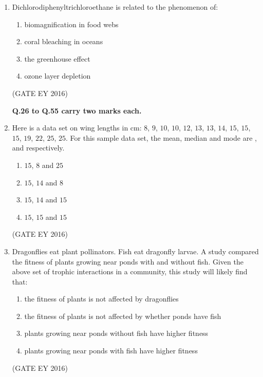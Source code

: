 \documentclass[journal]{IEEEtran}
\begin{document}
\begin{enumerate}
\item Dichlorodiphenyltrichloroethane is related to the phenomenon of:
\begin{enumerate}
    \item biomagnification in food webs
    \item coral bleaching in oceans
    \item the greenhouse effect
    \item ozone layer depletion
\end{enumerate}
\hfill{(GATE EY 2016)}

\textbf{Q.26 to Q.55 carry two marks each.}

\item Here is a data set on wing lengths in cm: $8$, $9$, $10$, $10$, $12$, $13$, $13$, $14$, $15$, $15$, $15$, $19$, $22$, $25$, $25$. For this sample data set, the mean, median and mode are \underline{\hspace{3cm}}, \underline{\hspace{3cm}} and \underline{\hspace{3cm}} respectively.
\begin{multicols}{4}
\begin{enumerate}
    \item $15$, $8$ and $25$
    \item $15$, $14$ and $8$
    \item $15$, $14$ and $15$
    \item $15$, $15$ and $15$
\end{enumerate}
\end{multicols}
\hfill{(GATE EY 2016)}

\item Dragonflies eat plant pollinators. Fish eat dragonfly larvae. A study compared the fitness of plants growing near ponds with and without fish. Given the above set of trophic interactions in a community, this study will likely find that:
\begin{enumerate}
    \item the fitness of plants is not affected by dragonflies
    \item the fitness of plants is not affected by whether ponds have fish
    \item plants growing near ponds without fish have higher fitness
    \item plants growing near ponds with fish have higher fitness
\end{enumerate}
\hfill{(GATE EY 2016)}


\end{enumerate}
\end{document}
